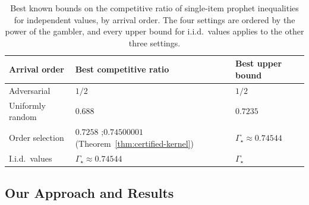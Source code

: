 \documentclass[11pt]{article}
\theoremstyle{definition}
\theoremstyle{remark}
\begin{document}
\begin{table}[t]
\centering
\small
\renewcommand{\arraystretch}{1.15}
\begin{tabular}{@{}l >{\raggedright\arraybackslash}p{5.6cm} >{\raggedright\arraybackslash}p{5.0cm}@{}}
\toprule
Arrival order & Best competitive ratio & Best upper bound\\
\midrule
Adversarial & $1/2$ \citep{KS77,SC84} & $1/2$\\
Uniformly random & $0.688$ \citep{CHLT25} & $0.7235$ \citep{GMS23}\\
Order selection & $0.7258$ \citep{BC};\newline $0.74500001$ (Theorem~\ref{thm:certified-kernel}) &
  $\Gamma_\star\approx0.74544$ \citep{HK82,Kertz86}\\
I.i.d.\ values & $\Gamma_\star\approx0.74544$ \citep{CFHOV21} & $\Gamma_\star$ \citep{HK82,Kertz86}\\
\bottomrule
\end{tabular}
\caption{Best known bounds on the competitive ratio of single-item prophet inequalities for
independent values, by arrival order. The four settings are ordered by the power of the
gambler, and every upper bound for i.i.d.\ values applies to the other three settings.}
\label{tab:known-bounds}
\end{table}

\subsection{Our Approach and Results}\label{sec:approach}
\end{document}

